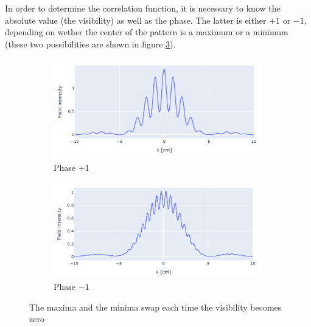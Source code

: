In order to determine the correlation function, it is necessary to know the absolute value (the visibility) as well as the phase. The latter is either $+1$ or 
$-1$, depending on wether the center of the pattern is a maximum or a minimum (these two possibilities are shown in figure \ref{swap}). 

\begin{figure}[!ht]
    \centering
    \begin{subfigure}[]{0.49\textwidth}
        \includegraphics[width = \textwidth]{Img/patt_1.png}
        \caption{Phase $+1$}
        \label{patt-1}
    \end{subfigure}
    \hfill
    \begin{subfigure}[]{0.49\textwidth}
        \includegraphics[width = \textwidth]{Img/patt_2.png}
        \caption{Phase $-1$}
        \label{patt-2}
    \end{subfigure}
    \caption{The maxima and the minima swap each time the visibility becomes zero}
    \label{swap}
\end{figure}